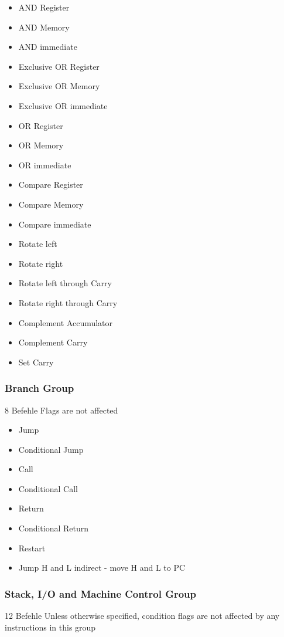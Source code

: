 \documentclass[12pt]{article}
\begin{document}
\begin{multicols}{2}
\begin{itemize}
\item AND Register
\item AND Memory
\item AND immediate
\item Exclusive OR Register
\item Exclusive OR Memory
\item Exclusive OR immediate
\item OR Register
\item OR Memory
\item OR immediate
\item Compare Register
\item Compare Memory
\item Compare immediate
\item Rotate left
\item Rotate right
\item Rotate left through Carry
\item Rotate right through Carry
\item Complement Accumulator
\item Complement Carry
\item Set Carry
\end{itemize}
\end{multicols}


\subsubsection{Branch Group}
8 Befehle
Flags are not affected

\begin{itemize}
\item Jump
\item Conditional Jump
\item Call
\item Conditional Call
\item Return
\item Conditional Return
\item Restart
\item Jump H and L indirect - move H and L to PC
\end{itemize}

\subsubsection{Stack, I/O and Machine Control Group}
12  Befehle
Unless otherwise specified, condition flags are not
affected by any instructions in this group
\end{document}
